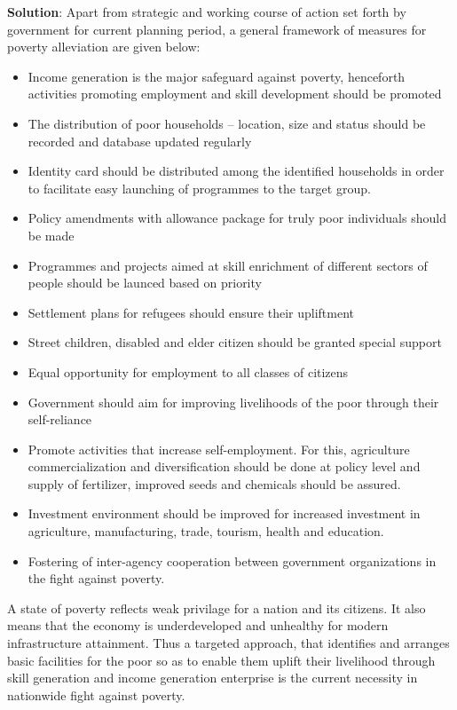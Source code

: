 \documentclass[
  openany]{book}
\newenvironment{solution}{ {\bfseries Solution}:}{}
\begin{document}
\begin{questions}
\begin{solution}
Apart from strategic and working course of action set forth by government for current planning period, a general framework of measures for poverty alleviation are given below:

\begin{itemize}
\item Income generation is the major safeguard against poverty, henceforth activities promoting employment and skill development should be promoted
\item The distribution of poor households -- location, size and status should be recorded and database updated regularly
\item Identity card should be distributed among the identified households in order to facilitate easy launching of programmes to the target group.
\item Policy amendments with allowance package for truly poor individuals should be made
\item Programmes and projects aimed at skill enrichment of different sectors of people should be launced based on priority
\item Settlement plans for refugees should ensure their upliftment
\item Street children, disabled and elder citizen should be granted special support
\item Equal opportunity for employment to all classes of citizens
\item Government should aim for improving livelihoods of the poor through their self-reliance
\item Promote activities that increase self-employment. For this, agriculture commercialization and diversification should be done at policy level and supply of fertilizer, improved seeds and chemicals should be assured.
\item Investment environment should be improved for increased investment in agriculture, manufacturing, trade, tourism, health and education.
\item Fostering of inter-agency cooperation between government organizations in the fight against poverty.
\end{itemize}

A state of poverty reflects weak privilage for a nation and its citizens. It also means that the economy is underdeveloped and unhealthy for modern infrastructure attainment. Thus a targeted approach, that identifies and arranges basic facilities for the poor so as to enable them uplift their livelihood through skill generation and income generation enterprise is the current necessity in nationwide fight against poverty.


\end{solution}
\end{questions}
\end{document}

